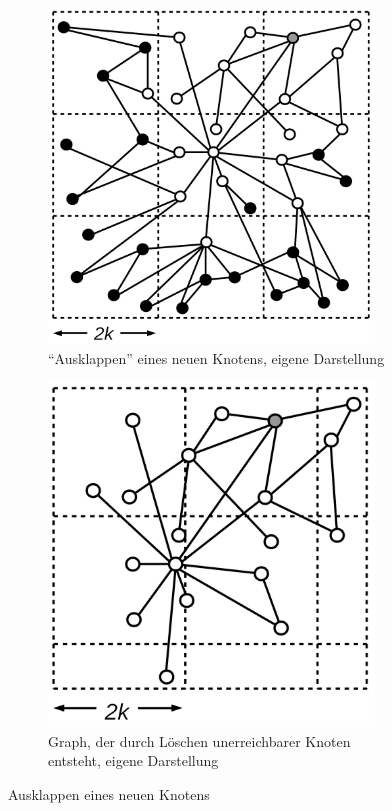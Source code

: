 \documentclass[12pt, a4paper]{article}
\begin{document}
\begin{figure}
\begin{subfigure}[t]{0.45\textwidth}
\includegraphics[width=0.95\textwidth]{graphTraversing_combined.png}
\caption["`Ausklappen"' eines neuen Knotens]{"`Ausklappen"' eines neuen Knotens, eigene Darstellung}
\label{graphTraversing_combined}
\end{subfigure}

\vspace{0.5cm}
\begin{subfigure}[t]{0.7\textwidth}
\centering
\includegraphics[width=0.95\textwidth]{graphTraversing_new.png}
\caption[Graph, der durch Löschen unerreichbarer Knoten entsteht]{Graph, der durch Löschen unerreichbarer Knoten entsteht, eigene Darstellung}
\label{graphTraversing_new}
\end{subfigure}
\caption{Ausklappen eines neuen Knotens}
\end{figure}
\end{document}
